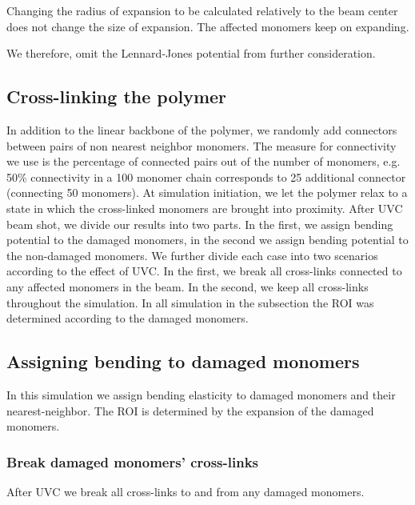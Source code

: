 \documentclass[12pt]{report}
\begin{document}
      Changing the radius of expansion to be calculated relatively to the beam center does not change the size of expansion. The affected monomers keep on expanding. 
      
      We therefore, omit the Lennard-Jones potential from further consideration.


   \subsection{Cross-linking the polymer}
	In addition to the linear backbone of the polymer, we randomly add connectors between pairs of non nearest neighbor monomers. The measure for connectivity we use is the percentage of connected pairs out of the number of monomers, e.g. 50\% connectivity in a 100 monomer chain  corresponds to 25 additional connector (connecting 50 monomers). 
	At simulation initiation, we let the polymer relax to a state in which the cross-linked monomers are brought into proximity. After UVC beam shot, we divide our results into two parts. In the first, we assign bending potential to the damaged monomers, in the second we assign bending potential to the non-damaged monomers. We further divide each case into two scenarios according to the effect of UVC. In the first, we break all cross-links connected to any affected monomers in the beam. In the second, we keep all cross-links throughout the simulation. 
	In all simulation in the subsection the ROI was determined according to the damaged monomers.
	
	\subsection{Assigning bending to damaged monomers}
	In this simulation we assign bending elasticity to damaged monomers and their nearest-neighbor. The ROI is determined by the expansion of the damaged monomers. 
	
	\subsubsection{Break damaged monomers' cross-links}
	After UVC we break all cross-links to and from any damaged monomers. 
		
\end{document}
